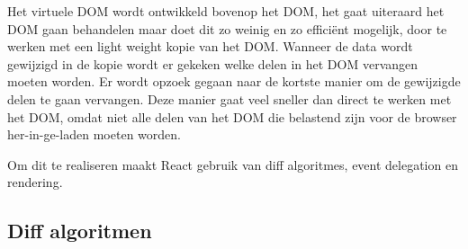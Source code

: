 	Het virtuele DOM wordt ontwikkeld bovenop het DOM, het gaat uiteraard het DOM gaan behandelen maar doet dit zo weinig en zo efficiënt mogelijk, door te werken met een light weight kopie van het DOM. Wanneer de data wordt gewijzigd in de kopie wordt er gekeken welke delen in het DOM vervangen moeten worden. Er wordt opzoek gegaan naar de kortste manier om de gewijzigde delen te gaan vervangen. Deze manier gaat veel sneller dan direct te werken met het DOM, omdat niet alle delen van het DOM die belastend zijn voor de browser her-in-ge-laden moeten worden.\citep{gackenheimer:react}
	
	Om dit te realiseren maakt React gebruik van diff algoritmes, event delegation en rendering.
	
	\subsection{Diff algoritmen}
		
